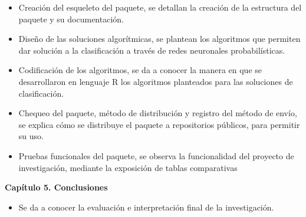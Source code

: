 \begin{itemize}
\item{Creación del esqueleto del paquete, se detallan la creación de la estructura del paquete y su documentación.}
\item{Diseño de las soluciones algorítmicas, se plantean los algoritmos que permiten dar solución a la clasificación a través de redes neuronales probabilísticas.}
\item{Codificación de los algoritmos, se da a conocer la manera en que se desarrollaron en lenguaje R los algoritmos planteados para las soluciones de clasificación.}
\item{Chequeo del paquete, método de distribución y registro del método de envío, se explica cómo se distribuye el paquete a repositorios públicos, para permitir su uso.}
\item{Pruebas funcionales del paquete, se observa la funcionalidad del proyecto de investigación, mediante
la exposición de tablas comparativas}
\end{itemize}
\textbf{Capítulo 5. Conclusiones}
\begin{itemize}
\item{Se da a conocer la evaluación e interpretación final de la investigación.}
\end{itemize}

